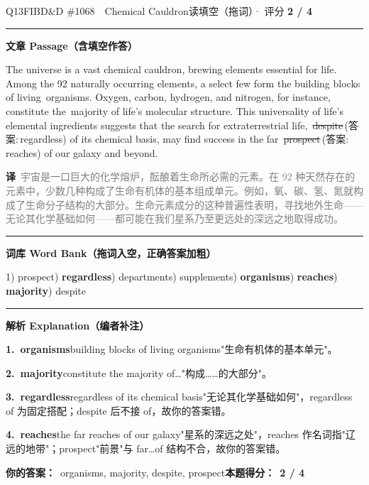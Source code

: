 \documentclass[11pt]{article}
\newcommand{\ptesub}[1]{%
  \par\needspace{2\baselineskip}\smallskip
  {\color{cAccent}\rule[-0.2ex]{3pt}{1.05em}}\hspace{6pt}%
  {\bfseries\color{cHead}#1}\par\nopagebreak\smallskip}
\newcommand{\zh}[1]{{\footnotesize\textcolor{cNote}{\textbf{译}}\ \textcolor{gray}{#1}}}
\newcommand{\rok}[1]{{\color{cFix}\ding{51}\,#1}}                 %
\newcommand{\rno}[2]{{\color{cWrong}\ding{55}\,\sout{#1}}\,{\footnotesize\color{cFix}(答案:\,#2)}}  %
\begin{document}
\begin{qblock}{Q13\quad FIBD\&D \#1068\ \ Chemical Cauldron}{读填空（拖词）· 评分 \textcolor{cAccent}{\bfseries 2 / 4}}
\ptesub{文章 Passage（含填空作答）}
\begin{promptbox}
The universe is a vast chemical cauldron, brewing elements essential for life. Among the 92 naturally occurring elements, a select few form the building blocks of living \rok{organisms}. Oxygen, carbon, hydrogen, and nitrogen, for instance, constitute the \rok{majority} of life's molecular structure. This universality of life's elemental ingredients suggests that the search for extraterrestrial life, \rno{despite}{regardless} of its chemical basis, may find success in the far \rno{prospect}{reaches} of our galaxy and beyond.
\end{promptbox}
\zh{宇宙是一口巨大的化学熔炉，酝酿着生命所必需的元素。在 92 种天然存在的元素中，少数几种构成了生命有机体的基本组成单元。例如，氧、碳、氢、氮就构成了生命分子结构的大部分。生命元素成分的这种普遍性表明，寻找地外生命——无论其化学基础如何——都可能在我们星系乃至更远处的深远之地取得成功。}
\ptesub{词库 Word Bank（拖词入空，正确答案加粗）}
{\small 1) prospect) \textbf{regardless}) departments) supplements) \textbf{organisms}) \textbf{reaches}) \textbf{majority}) despite}
\ptesub{解析 Explanation（编者补注）}
\begin{notebox}\footnotesize
\textbf{1.\ organisms}\quad building blocks of living organisms"生命有机体的基本单元"。\par\smallskip
\textbf{2.\ majority}\quad constitute the majority of\dots"构成……的大部分"。\par\smallskip
\textbf{3.\ regardless}\quad regardless of its chemical basis"无论其化学基础如何"，regardless of 为固定搭配；despite 后不接 of，故你的答案错。\par\smallskip
\textbf{4.\ reaches}\quad the far reaches of our galaxy"星系的深远之处"，reaches 作名词指"辽远的地带"；prospect"前景"与 far\dots of 结构不合，故你的答案错。
\end{notebox}
\smallskip
\textbf{你的答案：}\ organisms, majority, {\color{cWrong}despite, prospect}\qquad\textbf{本题得分：}\ {\color{cAccent}\bfseries 2 / 4}
\end{qblock}
\end{document}
